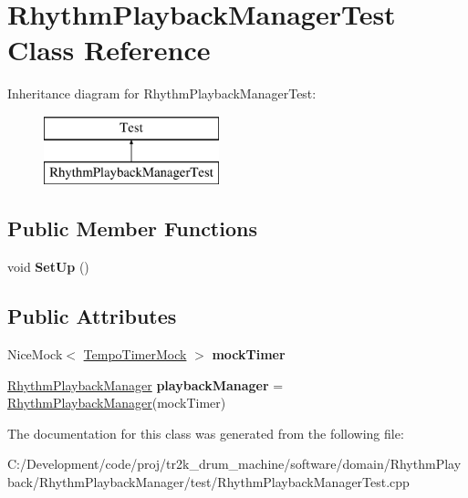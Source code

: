 \hypertarget{class_rhythm_playback_manager_test}{}\section{Rhythm\+Playback\+Manager\+Test Class Reference}
\label{class_rhythm_playback_manager_test}
Inheritance diagram for Rhythm\+Playback\+Manager\+Test\+:\begin{figure}[H]
\begin{center}
\leavevmode
\includegraphics[height=2.000000cm]{class_rhythm_playback_manager_test}
\end{center}
\end{figure}
\subsection*{Public Member Functions}
\begin{DoxyCompactItemize}
\item 
\mbox{\label{class_rhythm_playback_manager_test_aabd70388e626a9e4e298634461ebd677}} 
void {\bfseries Set\+Up} ()
\end{DoxyCompactItemize}
\subsection*{Public Attributes}
\begin{DoxyCompactItemize}
\item 
\mbox{\label{class_rhythm_playback_manager_test_a146164602a24746aa8f5bba7a737f83c}} 
Nice\+Mock$<$ \mbox{\hyperlink{class_tempo_timer_mock}{Tempo\+Timer\+Mock}} $>$ {\bfseries mock\+Timer}
\item 
\mbox{\label{class_rhythm_playback_manager_test_ab3cd681e5a76ba59bc9c834dcdae2d64}} 
\mbox{\hyperlink{class_rhythm_playback_manager}{Rhythm\+Playback\+Manager}} {\bfseries playback\+Manager} = \mbox{\hyperlink{class_rhythm_playback_manager}{Rhythm\+Playback\+Manager}}(mock\+Timer)
\end{DoxyCompactItemize}


The documentation for this class was generated from the following file\+:\begin{DoxyCompactItemize}
\item 
C\+:/\+Development/code/proj/tr2k\+\_\+drum\+\_\+machine/software/domain/\+Rhythm\+Playback/\+Rhythm\+Playback\+Manager/test/Rhythm\+Playback\+Manager\+Test.\+cpp\end{DoxyCompactItemize}
